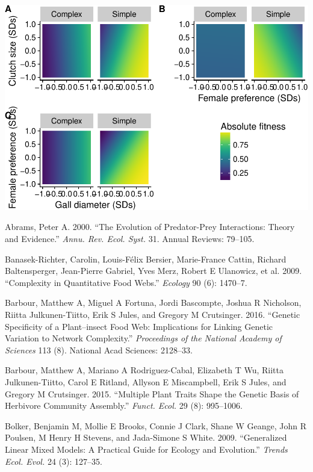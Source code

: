 \documentclass[]{elsarticle} %
\makeatletter
\def\maxwidth{\ifdim\Gin@nat@width>\linewidth\linewidth
\else\Gin@nat@width\fi}
\let\Oldincludegraphics\includegraphics
\renewcommand{\includegraphics}[1]{\Oldincludegraphics[width=\maxwidth]{#1}}
\makeatother
\begin{document}
\includegraphics{elsevier_test_files/figure-latex/Figure S2 Multivariate Absolute Fitness Landscapes-1.pdf}

\hypertarget{refs}{}
\hypertarget{ref-Abrams2000}{}
Abrams, Peter A. 2000. ``The Evolution of Predator-Prey Interactions:
Theory and Evidence.'' \emph{Annu. Rev. Ecol. Syst.} 31. Annual Reviews:
79--105.

\hypertarget{ref-Banasek-Richter2009}{}
Banasek-Richter, Carolin, Louis-Félix Bersier, Marie-France Cattin,
Richard Baltensperger, Jean-Pierre Gabriel, Yves Merz, Robert E
Ulanowicz, et al. 2009. ``Complexity in Quantitative Food Webs.''
\emph{Ecology} 90 (6): 1470--7.

\hypertarget{ref-Barbour2016}{}
Barbour, Matthew A, Miguel A Fortuna, Jordi Bascompte, Joshua R
Nicholson, Riitta Julkunen-Tiitto, Erik S Jules, and Gregory M
Crutsinger. 2016. ``Genetic Specificity of a Plant--insect Food Web:
Implications for Linking Genetic Variation to Network Complexity.''
\emph{Proceedings of the National Academy of Sciences} 113 (8). National
Acad Sciences: 2128--33.

\hypertarget{ref-Barbour2015}{}
Barbour, Matthew A, Mariano A Rodriguez-Cabal, Elizabeth T Wu, Riitta
Julkunen-Tiitto, Carol E Ritland, Allyson E Miscampbell, Erik S Jules,
and Gregory M Crutsinger. 2015. ``Multiple Plant Traits Shape the
Genetic Basis of Herbivore Community Assembly.'' \emph{Funct. Ecol.} 29
(8): 995--1006.

\hypertarget{ref-Bolker2009}{}
Bolker, Benjamin M, Mollie E Brooks, Connie J Clark, Shane W Geange,
John R Poulsen, M Henry H Stevens, and Jada-Simone S White. 2009.
``Generalized Linear Mixed Models: A Practical Guide for Ecology and
Evolution.'' \emph{Trends Ecol. Evol.} 24 (3): 127--35.
\end{document}
